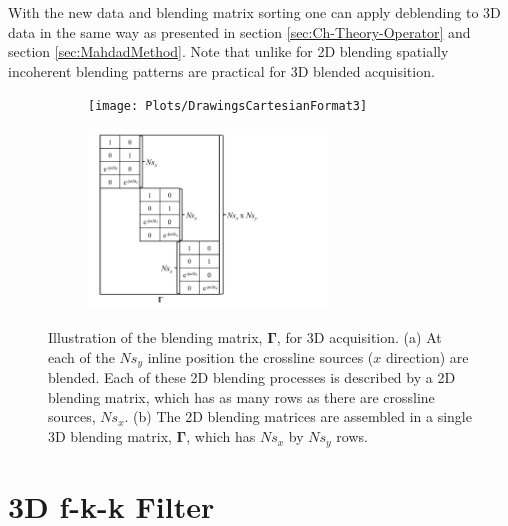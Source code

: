 
With the new data and blending matrix sorting one can apply deblending to 3D data in the same way as presented in section \ref{sec:Ch-Theory-Operator} and section \ref{sec:MahdadMethod}. Note that unlike for 2D blending spatially incoherent blending patterns are practical for 3D blended acquisition.

\begin{figure}

	\begin{subfigure}[t]{0.5\textwidth}
		\centering
		\texttt{[image: Plots/DrawingsCartesianFormat3]}
		\caption{}
		\label{fig:Ch-Theory-3D-BlendedAcquisition}
	\end{subfigure}
	\begin{subfigure}[t]{0.5\textwidth}
		\centering
		\includegraphics[width = 0.7\textwidth]{Plots/DrawingsCartesianFormat2}
		\caption{}
		\label{fig:Ch-Theory-3D-BlendingMatrix}
	\end{subfigure}
	
	\caption{Illustration of the blending matrix, $\mathbf{\Gamma}$, for 3D acquisition. (a) At each of the $Ns_y$ inline position the crossline sources ($x$ direction) are blended. Each of these 2D blending processes is described by a 2D blending matrix, which has as many rows as there are crossline sources, $Ns_x$. (b) The 2D blending matrices are assembled in a single 3D blending matrix, $\mathbf{\Gamma}$, which has $Ns_x$ by $Ns_y$ rows.}
	\label{fig:Ch-Theory-3D-BlendingMatrix-Design}

\end{figure}


\section{3D f-k-k Filter} \label{sec:Ch-Theory-3dExtension-FKK}

